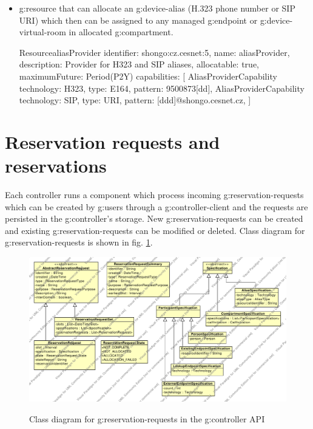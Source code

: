 \begin{itemize}
\item \Gls{g:resource} that can allocate an \gls{g:device-alias} (H.323 phone number or SIP URI) which then can be assigned to any managed \gls{g:endpoint} or \gls{g:device-virtual-room} in allocated \gls{g:compartment}.

\begin{ObjectCode}{Resource}{aliasProvider}{}
identifier: shongo:cz.cesnet:5,
name: aliasProvider,
description: Provider for H323 and SIP aliases,
allocatable: true,
maximumFuture: Period(P2Y)
capabilities: [  
  AliasProviderCapability {
    technology: H323,
    type: E164,
    pattern: 9500873[dd],
  }
  AliasProviderCapability {
    technology: SIP,
    type: URI,
    pattern: [ddd]@shongo.cesnet.cz,
  }
]
\end{ObjectCode}

\end{itemize}


\section{Reservation requests and reservations}

Each controller runs a component which process incoming \glspl{g:reservation-request} which can be created by \glspl{g:user} through a \gls{g:controller-client} and the requests are persisted in the \gls{g:controller}'s storage. New \glspl{g:reservation-request} can be created and existing \glspl{g:reservation-request} can be modified or deleted. Class diagram for \glspl{g:reservation-request} is shown in fig. \ref{fig:cd_api_reservation_requests}.

\begin{figure}[ht!]
\includegraphics[width=\textwidth]{diagrams/cd_api_reservation_requests}
\label{fig:cd_api_reservation_requests}
\caption{Class diagram for \glspl{g:reservation-request} in the \gls{g:controller} API}
\end{figure}

